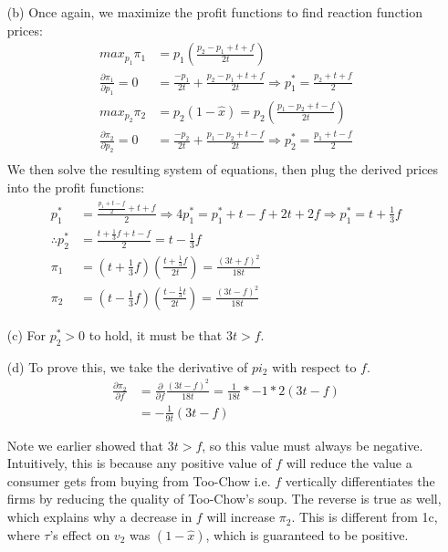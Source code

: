 \documentclass[12pt,letterpaper]{article}
\begin{document}
\begin{enumerate}
\begin{enumerate}
\begin{enumerate}
		\item[(b)] Once again, we maximize the profit functions to find reaction function prices:
		 \begin{align*}
			 max_{p_1} \pi_1 &= p_1 (\frac{p_2 - p_1 + t + f}{2t}) \\
			\frac{\partial\pi_1}{\partial p_1}= 0  &= \frac{-p_1}{2t} + \frac{p_2 - p_1 + t + f}{2t} \Rightarrow p_1^* = \frac{p_2 + t + f}{2} \\
			max_{p_2} \pi_2 &= p_2 (1 - \hat{x}) = p_2 (\frac{p_1 - p_2 + t - f}{2t}) \\
			\frac{\partial\pi_2}{\partial p_2} = 0&= \frac{-p_2}{2t} + \frac{p_1 - p_2 + t - f}{2t} \Rightarrow p_2^* =  \frac{p_1 + t - f }{2} \\
		 \end{align*}
		 We then solve the resulting system of equations, then plug the derived prices into the profit functions:
		 \begin{align*}
			p_1^* &= \frac{\frac{p_1 + t - f }{2} + t + f}{2} \Rightarrow 4p_1^* = p_1^* + t - f + 2t + 2f \Rightarrow p_1^* = t + \frac{1}{3}f \\
			\therefore p_2^* &= \frac{t + \frac{1}{3}f + t - f}{2} = t - \frac{1}{3}f \\
			\pi_1 &= (t + \frac{1}{3}f)(\frac{t + \frac{1}{3}f}{2t}) = \frac{(3t+f)^2}{18t} \\
			\pi_2 &= (t - \frac{1}{3}f)(\frac{t-\frac{1}{3}t}{2t}) = \frac{(3t-f)^2}{18t}
		 \end{align*}


		 \item[(c)] For $p_2^* > 0$ to hold, it must be that $3t > f$.
		 \item[(d)] To prove this, we take the derivative of $pi_2$ with respect to $f$. 
		 \begin{align*}
			 \frac{\partial\pi_2}{\partial f} &= \frac{\partial}{\partial f} \frac{(3t-f)^2}{18t} = \frac{1}{18t} * -1 * 2(3t-f) \\
			 &= -\frac{1}{9t}(3t-f)
		 \end{align*}

		 Note we earlier showed that $3t > f$, so this value must always be negative. Intuitively, this is because any positive value of $f$ will reduce the value a consumer gets from buying from Too-Chow i.e. $f$ vertically differentiates the firms by reducing the quality of Too-Chow's soup. The reverse is true as well, which explains why a decrease in $f$ will increase $\pi_2$. This is different from 1c, where $\tau$'s effect on $v_2$ was $(1-\hat{x})$, which is guaranteed to be positive.
	\end{enumerate} 


\end{enumerate}
\end{enumerate}
\end{document}
